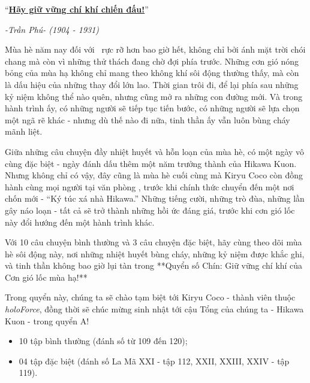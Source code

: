 \documentclass[main.tex]{subfiles}
\begin{document}
\begin{tcolorbox}[
        colframe=vol,  %
        colback=white,   %
        boxrule=0.5pt,   %
        arc=0mm,         %
        left=5pt,        %
        right=5pt,       %
        top=5pt,         %
        bottom=5pt       %
    ]
    ``\uline{\textbf{Hãy giữ vững chí khí chiến đấu!}}''

    \begin{flushright}
        \textit{-Trần Phú- (1904 - 1931)}
    \end{flushright}
\end{tcolorbox}

Mùa hè năm nay đối với \hll\ rực rỡ hơn bao giờ hết, không chỉ bởi ánh mặt trời chói chang mà còn vì những thử thách đang chờ đợi phía trước. Những cơn gió nóng bỏng của mùa hạ không chỉ mang theo không khí sôi động thường thấy, mà còn là dấu hiệu của những thay đổi lớn lao. Thời gian trôi đi, để lại phía sau những kỷ niệm không thể nào quên, nhưng cũng mở ra những con đường mới. Và trong hành trình ấy, có những người sẽ tiếp tục tiến bước, có những người sẽ lựa chọn một ngã rẽ khác - nhưng dù thế nào đi nữa, tinh thần ấy vẫn luôn bùng cháy mãnh liệt.

Giữa những câu chuyện đầy nhiệt huyết và hỗn loạn của mùa hè, có một ngày vô cùng đặc biệt - ngày đánh dấu thêm một năm trưởng thành của Hikawa Kuon. Nhưng không chỉ có vậy, đây cũng là mùa hè cuối cùng mà Kiryu Coco còn đồng hành cùng mọi người tại văn phòng \hll, trước khi chính thức chuyển đến một nơi chốn mới - ``Ký túc xá nhà Hikawa.'' Những tiếng cười, những trò đùa, những lần gây náo loạn - tất cả sẽ trở thành những hồi ức đáng giá, trước khi cơn gió lốc này đổi hướng đến một hành trình khác.

Với 10 câu chuyện bình thường và 3 câu chuyện đặc biệt, hãy cùng theo dõi mùa hè sôi động này, nơi những nhiệt huyết bùng cháy, những kỷ niệm được khắc ghi, và tinh thần không bao giờ lụi tàn trong **Quyển số Chín: Giữ vững chí khí của Cơn gió lốc mùa hạ!**

Trong quyển này, chúng ta sẽ chào tạm biệt tới Kiryu Coco - thành viên thuộc \textit{holoForce}, đồng thời sẽ chúc mừng sinh nhật tới cậu Tổng của chúng ta - Hikawa Kuon - trong quyển A!

{}
\begin{itemize}
    \item 10 tập bình thường (đánh số từ 109 đến 120);
    \item 04 tập đặc biệt (đánh số La Mã XXI - tập 112, XXII, XXIII, XXIV - tập 119).
\end{itemize}
\end{document}
